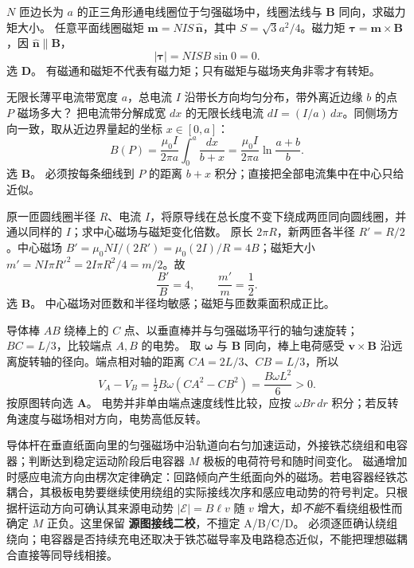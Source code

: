 \problemtext $N$ 匝边长为 $a$ 的正三角形通电线圈位于匀强磁场中，线圈法线与 $\bm B$ 同向，求磁力矩大小。
\workings 任意平面线圈磁矩 $\bm m=NI S\,\hat{\bm n}$，其中 $S=\sqrt3 a^2/4$。磁力矩 $\bm\tau=\bm m\times\bm B$，因 $\hat{\bm n}\parallel\bm B$，
\[\boxed{|\bm\tau|=NISB\sin0=0}.\]
选 \textbf{D}。
\crosscheck 有磁通和磁矩不代表有磁力矩；只有磁矩与磁场夹角非零才有转矩。

\problemtext 无限长薄平电流带宽度 $a$，总电流 $I$ 沿带长方向均匀分布，带外离近边缘 $b$ 的点 $P$ 磁场多大？
\workings 把电流带分解成宽 $dx$ 的无限长线电流 $dI=(I/a)\,dx$。同侧场方向一致，取从近边界量起的坐标 $x\in[0,a]$：
\[B(P)=\frac{\mu_0 I}{2\pi a}\int_0^a\frac{dx}{b+x}
=\boxed{\frac{\mu_0 I}{2\pi a}\ln\frac{a+b}{b}}.\]
选 \textbf{B}。
\crosscheck 必须按每条细线到 $P$ 的距离 $b+x$ 积分；直接把全部电流集中在中心只给近似。

\problemtext 原一匝圆线圈半径 $R$、电流 $I$，将原导线在总长度不变下绕成两匝同向圆线圈，并通以同样的 $I$；求中心磁场与磁矩变化倍数。
\workings 原长 $2\pi R$，新两匝各半径 $R'=R/2$。中心磁场 $B'=\mu_0NI/(2R')=\mu_0(2I)/R=4B$；磁矩大小 $m'=NI\pi R'^2=2I\pi R^2/4=m/2$。故
\[\boxed{\frac{B'}B=4,\qquad \frac{m'}m=\frac12}.\]
选 \textbf{B}。
\crosscheck 中心磁场对匝数和半径均敏感；磁矩与匝数乘面积成正比。

\problemtext 导体棒 $AB$ 绕棒上的 $C$ 点、以垂直棒并与匀强磁场平行的轴匀速旋转；$BC=L/3$，比较端点 $A,B$ 的电势。
\workings 取 $\bm\omega$ 与 $\bm B$ 同向，棒上电荷感受 $\bm v\times\bm B$ 沿远离旋转轴的径向。端点相对轴的距离 $CA=2L/3$、$CB=L/3$，所以
\[\boxed{V_A-V_B=\tfrac12B\omega(CA^2-CB^2)=\frac{B\omega L^2}{6}>0}.\]
按原图转向选 \textbf{A}。
\crosscheck 电势并非单由端点速度线性比较，应按 $\omega Br\,dr$ 积分；若反转角速度与磁场相对方向，电势高低反转。

\problemtext 导体杆在垂直纸面向里的匀强磁场中沿轨道向右匀加速运动，外接铁芯绕组和电容器；判断达到稳定运动阶段后电容器 $M$ 极板的电荷符号和随时间变化。
\workings 磁通增加时感应电流方向由楞次定律确定：回路倾向产生纸面向外的磁场。若电容器经铁芯耦合，其极板电势要继续使用绕组的实际接线次序和感应电动势的符号判定。只根据杆运动方向可确认其来源电动势 $|\mathcal E|=B\ell v$ 随 $v$ 增大，却\emph{不能}不看绕组极性而确定 $M$ 正负。这里保留 \textbf{源图接线二校}，不擅定 A/B/C/D。
\crosscheck 必须逐匝确认绕组绕向；电容器是否持续充电还取决于铁芯磁导率及电路稳态近似，不能把理想磁耦合直接等同导线相接。
